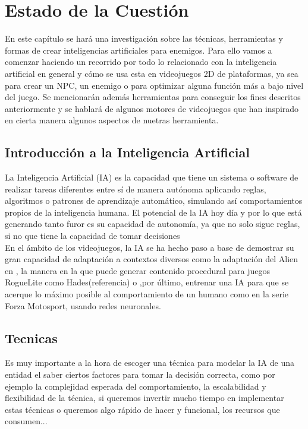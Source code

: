 \chapter{Estado de la Cuestión}
\label{cap:estadoDeLaCuestion}
En este capítulo se hará una investigación sobre las técnicas, herramientas y formas de crear inteligencias artificiales para enemigos.
Para ello vamos a comenzar haciendo un recorrido por todo lo relacionado con la inteligencia artificial en general y cómo se usa esta en videojuegos 2D de plataformas, ya sea para crear un NPC, un enemigo o para optimizar alguna función más a bajo nivel del juego.
Se mencionarán además herramientas para conseguir los fines descritos anteriormente y se hablará de algunos motores de videojuegos que han inspirado en cierta manera algunos aspectos de nuetras herramienta. \\
\section{Introducción a la Inteligencia Artificial}

La Inteligencia Artificial (IA) es la capacidad que tiene un sistema o software de realizar tareas diferentes entre sí de manera autónoma aplicando reglas, algoritmos o patrones de aprendizaje automático, simulando así comportamientos propios de la inteligencia humana.
El potencial de la IA hoy día y por lo que está generando tanto furor es su capacidad de autonomía, ya que no solo sigue reglas, si no que tiene la capacidad de tomar decisiones\\
En el ámbito de los videojuegos, la IA se ha hecho paso a base de demostrar su gran capacidad de adaptación a contextos diversos como la adaptación del Alien en \cite{Alien Isolation}, la manera en la que puede generar contenido procedural para juegos RogueLite como Hades(referencia) o ,por último, entrenar una IA para que se acerque lo máximo posible al comportamiento de un humano como en la serie Forza Motosport, usando redes neuronales.\\
\section{Tecnicas}

Es muy importante a la hora de escoger una técnica para modelar la IA de una entidad el saber ciertos factores para tomar la decisión correcta, como por ejemplo la complejidad esperada del comportamiento, la escalabilidad y flexibilidad de la técnica, si queremos invertir mucho tiempo en implementar estas técnicas o queremos algo rápido de hacer y funcional, los recursos que consumen... \\

